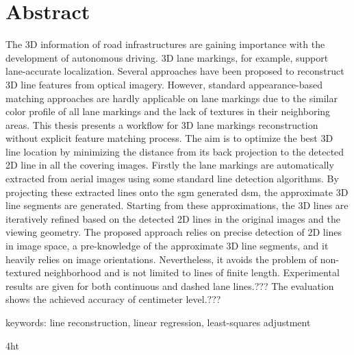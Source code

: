 \documentclass[
               paper=a4,
               twoside,  %
               bibliography=totoc,
               headsepline,
               cleardoublepage=empty,
               parskip=half,
               final   %
               ]{scrbook}
\begin{document}
\section*{Abstract}
\fi
The 3D information of road infrastructures are gaining importance with the development of autonomous driving. 3D lane markings, for example, support lane-accurate localization. 
Several approaches have been proposed to reconstruct 3D line features from optical imagery. However, standard appearance-based matching approaches are hardly applicable on lane markings due to the similar color profile of all lane markings and the lack of textures in their neighboring areas. 
This thesis presents a workflow for 3D lane markings reconstruction without explicit feature matching process. The aim is to optimize the best 3D line location by minimizing the distance from its back projection to the detected 2D line in all the covering images.
Firstly the lane markings are automatically extracted from aerial images using some standard line detection algorithms. By projecting these extracted lines onto the \gls{sgm} generated \gls{dsm}, the approximate 3D line segments are generated. Starting from these approximations, the 3D lines are iteratively refined based on the detected 2D lines in the original images and the viewing geometry. 
The proposed approach relies on precise detection of 2D lines in image space, a pre-knowledge of the approximate 3D line segments, and it heavily relies on image orientations. Nevertheless, it avoids the problem of non-textured neighborhood and is not limited to lines of finite length. 
Experimental results are given for both continuous and dashed lane lines.??? The evaluation shows the achieved accuracy of centimeter level.???

\vspace{3cm}

keywords: line reconstruction, linear regression, least-squares adjustment
\cleardoublepage



\iftex4ht
\else
{}
\fi

%
%

%
%
%
\tableofcontents
\end{document}
